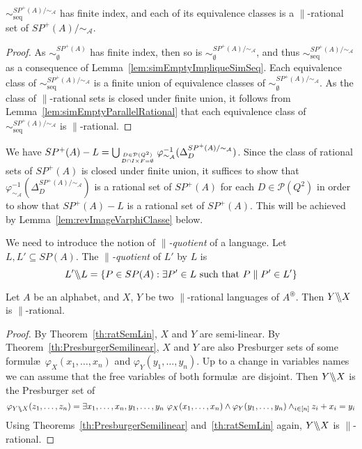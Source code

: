 \documentclass{CSML}
\newcommand{\quotientparallel}[2]{\ensuremath{#1\backslash\kern-3pt\backslash#2}}
\begin{document}
\begin{lem}
  \label{lem:equivSeq}
  $\sim_\text{seq}^{SP^+(A)/\mathord{\sim_{\mathcal{A}}}}$ has finite index, and each of its equivalence classes is a $\parallel$-rational set of $SP^+(A)/\mathord{\sim_{\mathcal{A}}}$.
\end{lem}

\begin{proof}
    As $\sim_\emptyset^{SP^+(A)}$ has finite index, then so is $\sim_\emptyset^{SP^+(A)/\mathord{\sim_{\mathcal{A}}}}$, and thus $\sim_\text{seq}^{SP^+(A)/\mathord\sim_\mathcal{A}}$ as a consequence of Lemma~\ref{lem:simEmptyImpliqueSimSeq}.
  Each equivalence class of $\sim_\text{seq}^{SP^+(A)/\mathord\sim_\mathcal{A}}$ is a finite union of equivalence classes of $\sim_\emptyset^{SP^+(A)/\mathord{\sim_{\mathcal{A}}}}$.
  As the class of $\parallel$-rational sets is closed under finite union, it follows from Lemma~\ref{lem:simEmptyParallelRational} that each equivalence class of $\sim_\text{seq}^{SP^+(A)/\mathord\sim_\mathcal{A}}$ is $\parallel$-rational.
\end{proof}

We have $SP^+(A)-L=\bigcup_{D\in\mathcal{P}(Q^2)\atop D\cap I\times F=\emptyset}\varphi^{-1}_{\sim_\mathcal{A}}(\Delta_D^{SP^+(A)/\mathord\sim_\mathcal{A}})$. Since the class of rational sets of $SP^+(A)$ is closed under finite union, it suffices to show that $\varphi^{-1}_{\sim_\mathcal{A}}(\Delta_D^{SP^+(A)/\mathord\sim_\mathcal{A}})$ is a rational set of $SP^+(A)$ for each $D\in\mathcal{P}(Q^2)$ in order to show that $SP^+(A)-L$ is a rational set of $SP^+(A)$. This will be achieved by Lemma~\ref{lem:revImageVarphiClasse} below.

We need to introduce the notion of \emph{$\parallel$-quotient} of a language. Let $L,L'\subseteq SP(A)$. The \emph{$\parallel$-quotient} of $L'$ by $L$ is $$\quotientparallel{L'}{L}=\{P\in SP(A) : \exists P'\in L\text{ such that } P\parallel P'\in L'\}$$

\begin{lem}
  \label{lem:quotientSemilinear}
  Let $A$ be an alphabet, and $X$, $Y$ be two $\parallel$-rational languages of $A^\circledast$. Then $\quotientparallel{Y}{X}$ is $\parallel$-rational.
\end{lem}

\begin{proof}
  By Theorem~\ref{th:ratSemLin}, $X$ and $Y$ are semi-linear. 
  By Theorem~\ref{th:PresburgerSemilinear}, $X$ and $Y$ are also Presburger sets of some formul{\ae}\ $\varphi_X(x_1,\dots,x_n)$ and $\varphi_Y(y_1,\dots,y_n)$. Up to a change in variables names we can assume that the free variables of both formul{\ae}\ are disjoint. Then $\quotientparallel{Y}{X}$ is the Presburger set of $$\varphi_{\quotientparallel{Y}{X}}(z_1,\dots,z_n)=\exists x_1,\dots,x_n,y_1,\dots,y_n\ \varphi_X(x_1,\dots,x_n)\land\varphi_Y(y_1,\dots,y_n)\land_{i\in[n]}z_i+x_i=y_i$$
  Using Theorems~\ref{th:PresburgerSemilinear} and~\ref{th:ratSemLin} again, $\quotientparallel{Y}{X}$ is $\parallel$-rational.
\end{proof}
 
\end{document}

